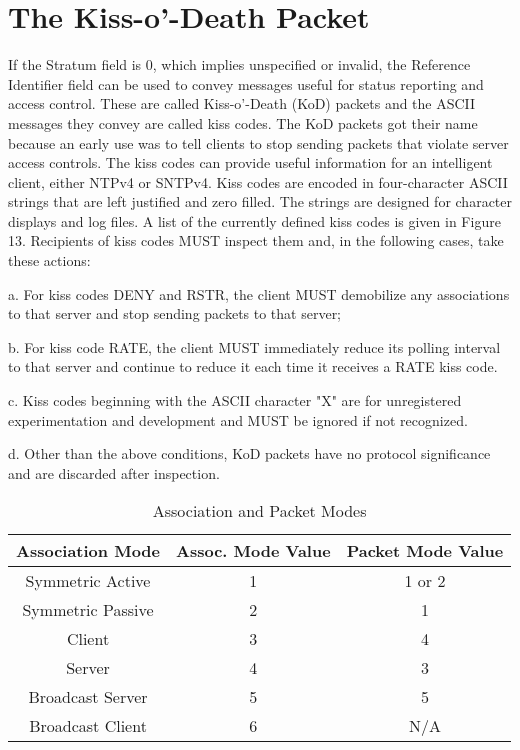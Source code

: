 \section{The Kiss-o’-Death Packet}

If the Stratum field is 0, which implies unspecified or invalid, the
Reference Identifier field can be used to convey messages useful for
status reporting and access control. These are called Kiss-o’-Death
(KoD) packets and the ASCII messages they convey are called kiss
codes. The KoD packets got their name because an early use was to
tell clients to stop sending packets that violate server access
controls. The kiss codes can provide useful information for an
intelligent client, either NTPv4 or SNTPv4. Kiss codes are encoded
in four-character ASCII strings that are left justified and zero
filled. The strings are designed for character displays and log
files. A list of the currently defined kiss codes is given in
Figure 13. Recipients of kiss codes MUST inspect them and, in the
following cases, take these actions:

a. For kiss codes DENY and RSTR, the client MUST demobilize any
associations to that server and stop sending packets to that
server;

b. For kiss code RATE, the client MUST immediately reduce its
polling interval to that server and continue to reduce it each
time it receives a RATE kiss code.

c. Kiss codes beginning with the ASCII character "X" are for
unregistered experimentation and development and MUST be ignored
if not recognized.

d. Other than the above conditions, KoD packets have no protocol
significance and are discarded after inspection.

\begin{table}[htb]
\center
\begin{tabular}{c | c | c}
Association Mode & Assoc. Mode Value & Packet Mode Value \\
\hline
\hline
Symmetric Active & 1 & 1 or 2 \\
Symmetric Passive & 2 & 1 \\
Client & 3 & 4 \\
Server & 4 & 3 \\
Broadcast Server & 5 & 5 \\
Broadcast Client & 6 & N/A \\
\hline
\end{tabular}
\label{association_and_packet_modes}
\caption{Association and Packet Modes}
\end{table}

